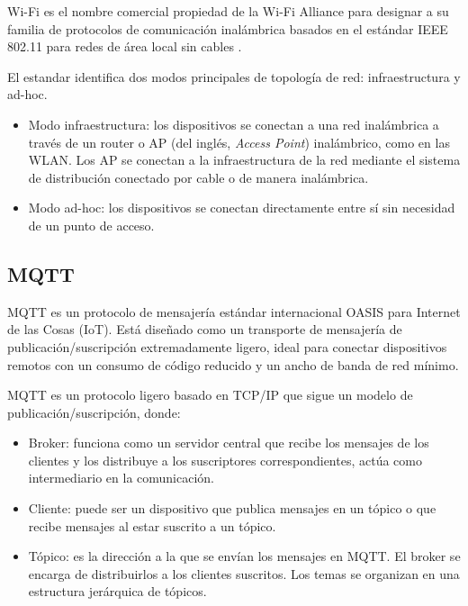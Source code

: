 Wi-Fi es el nombre comercial propiedad de la Wi-Fi Alliance para designar a su
familia de protocolos de comunicación inalámbrica basados en el estándar IEEE
802.11 para redes de área local sin cables \cite{Li2019}.

El estandar identifica dos modos principales de topología de red:
infraestructura y ad-hoc.

\begin{itemize}
	\item Modo infraestructura: los dispositivos se conectan a una red inalámbrica a
	      través de un router o AP (del inglés, \textit{Access Point}) inalámbrico, como en las WLAN.
	      Los AP se conectan a la infraestructura de la red mediante el sistema de
	      distribución conectado por cable o de manera inalámbrica.
	\item Modo ad-hoc: los dispositivos se conectan directamente entre sí sin necesidad
	      de un punto de acceso.
\end{itemize}

\subsection{MQTT}

MQTT es un protocolo de mensajería estándar internacional OASIS
\cite{OASIS_MQTT_Standard} para Internet de las Cosas (IoT). Está diseñado como
un transporte de mensajería de publicación/suscripción extremadamente ligero,
ideal para conectar dispositivos remotos con un consumo de código reducido y un
ancho de banda de red mínimo.

MQTT es un protocolo ligero basado en TCP/IP \cite{AWS_MQTT} que sigue un
modelo de publicación/suscripción, donde:

\begin{itemize}
	\item Broker: funciona como un servidor central que recibe los mensajes de los
	      clientes y los distribuye a los suscriptores correspondientes, actúa como
	      intermediario en la comunicación.
	\item Cliente: puede ser un dispositivo que publica mensajes en un tópico o que
	      recibe mensajes al estar suscrito a un tópico.
	\item Tópico: es la dirección a la que se envían los mensajes en MQTT. El broker se
	      encarga de distribuirlos a los clientes suscritos. Los temas se organizan en
	      una estructura jerárquica de tópicos.
\end{itemize}

